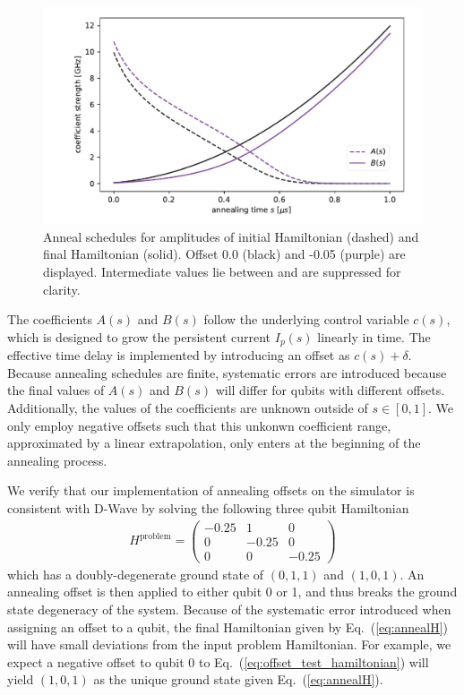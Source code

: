 \documentclass[10pt]{iopart}
\begin{document}
\begin{figure}[htb]
 \centering
  \includegraphics[width=\columnwidth]{./new_figures/anneal_schedule.pdf}
  \caption{
  Anneal schedules for amplitudes of initial Hamiltonian (dashed) and final Hamiltonian (solid).
  Offset 0.0 (black) and -0.05 (purple) are displayed.
  Intermediate values lie between and are suppressed for clarity.
 }
 \label{fig:anneal_schedule}
\end{figure}

The coefficients $A(s)$ and $B(s)$ follow the underlying control variable $c(s)$, which is designed to grow the persistent current $I_p(s)$ linearly in time.
The effective time delay is implemented by introducing an offset as $c(s) + \delta$.
Because annealing schedules are finite, systematic errors are introduced because the final values of $A(s)$ and $B(s)$ will differ for qubits with different offsets.
Additionally, the values of the coefficients are unknown outside of $s\in [0, 1]$.
We only employ negative offsets such that this unkonwn coefficient range, approximated by a linear extrapolation, only enters at the beginning of the annealing process.

We verify that our implementation of annealing offsets on the simulator is consistent with D-Wave by solving the following three qubit Hamiltonian
\begin{align}
	\label{eq:offset_test_hamiltonian}
	H^{\textrm{problem}} =
	\begin{pmatrix}
		-0.25 & 1 & 0 \\
		0 & -0.25 & 0 \\
		0 & 0 & -0.25
	\end{pmatrix}
\end{align}
which has a doubly-degenerate ground state of $(0, 1, 1)$ and $(1, 0, 1)$. An annealing offset is then applied to either qubit 0 or 1, and thus breaks the ground state degeneracy of the system. Because of the systematic error introduced when assigning an offset to a qubit, the final Hamiltonian given by Eq.~(\ref{eq:annealH}) will have small deviations from the input problem Hamiltonian. For example, we expect a negative offset to qubit 0 to Eq.~(\ref{eq:offset_test_hamiltonian}) will yield $(1, 0, 1)$ as the unique ground state given Eq.~(\ref{eq:annealH}).
\end{document}
